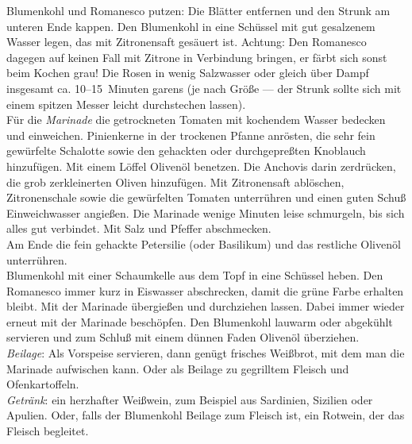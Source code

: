       \begin{zubereitung}
        Blumenkohl und Romanesco putzen: Die Blätter entfernen und den Strunk
	am unteren Ende kappen. Den Blumenkohl in eine Schüssel mit gut
	gesalzenem Wasser legen, das mit Zitronensaft gesäuert ist. Achtung:
	Den Romanesco dagegen auf keinen Fall mit Zitrone in Verbindung
	bringen, er färbt sich sonst beim Kochen grau! Die Rosen in wenig
	Salzwasser oder gleich über Dampf insgesamt ca. 10--15~Minuten garens
	(je nach Größe --- der Strunk sollte sich mit einem spitzen Messer
	leicht durchstechen lassen). \\
        Für die \emph{Marinade} die getrockneten Tomaten mit kochendem Wasser
	bedecken und einweichen. Pinienkerne in der trockenen Pfanne anrösten,
	die sehr fein gewürfelte Schalotte sowie den gehackten oder
	durchgepreßten Knoblauch hinzufügen. Mit einem Löffel Olivenöl
	benetzen. Die Anchovis darin zerdrücken, die grob zerkleinerten Oliven
	hinzufügen. Mit Zitronensaft ablöschen, Zitronenschale sowie die
	gewürfelten Tomaten unterrühren und einen guten Schuß Einweichwasser
	angießen. Die Marinade wenige Minuten leise schmurgeln, bis sich alles
	gut verbindet. Mit Salz und Pfeffer abschmecken. \\
        Am Ende die fein gehackte Petersilie (oder Basilikum) und das restliche
	Olivenöl unterrühren. \\
        Blumenkohl mit einer Schaumkelle aus dem Topf in eine Schüssel heben.
	Den Romanesco immer kurz in Eiswasser abschrecken, damit die grüne
	Farbe erhalten bleibt. Mit der Marinade übergießen und durchziehen
	lassen. Dabei immer wieder erneut mit der Marinade beschöpfen. Den
	Blumenkohl lauwarm oder abgekühlt servieren und zum Schluß mit einem
	dünnen Faden Olivenöl überziehen. \\
        \emph{Beilage}: Als Vorspeise servieren, dann genügt frisches Weißbrot,
	mit dem man die Marinade aufwischen kann. Oder als Beilage zu
	gegrilltem Fleisch und Ofenkartoffeln. \\
        \emph{Getränk}: ein herzhafter Weißwein, zum Beispiel aus Sardinien,
	Sizilien oder Apulien. Oder, falls der Blumenkohl Beilage zum Fleisch
	ist, ein Rotwein, der das Fleisch begleitet. \\
      \end{zubereitung}


